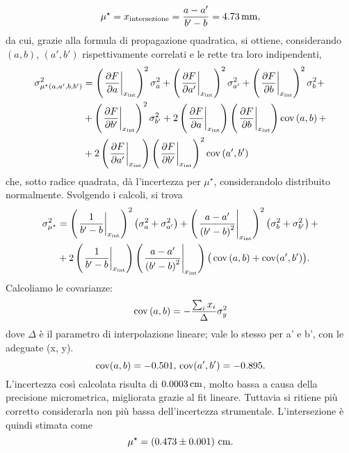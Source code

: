 \[ \mu ^{\star} = x_{\mathrm{intersezione}} = \frac{a - a'}{b' - b}  = 4.73 \,\mathrm{mm} , \]
da cui, grazie alla formula di propagazione quadratica, si ottiene, considerando $\left(a, b\right)$, $\left(a', b'\right)$ rispettivamente correlati e le rette tra loro indipendenti,
\begin{equation*}
\begin{split} %
	\sigma^2_{\mu ^{\star}\left(a, a', b, b'\right)}  &= \left(\left.\frac{\partial F}{\partial a}\right|_{x_{\mathrm{int}}}\right)^2   \sigma^2_{a} + \left(\left.\frac{\partial F}{\partial a'}\right|_{x_{\mathrm{int}}}\right)^2   \sigma^2_{a'} + \left(\left.\frac{\partial F}{\partial b}\right|_{x_{\mathrm{int}}}\right)^2   \sigma^2_{b} +\\
								&+ \left(\left.\frac{\partial F}{\partial b'}\right|_{x_{\mathrm{int}}}\right)^2   \sigma^2_{b'} + 2\left(\left.\frac{\partial F}{\partial a}\right|_{x_{\mathrm{int}}}\right)\left(\left.\frac{\partial F}{\partial b}\right|_{x_{\mathrm{int}}}\right)   \cov\left(a, b\right) + \\
								&+ 2\left(\left.\frac{\partial F}{\partial a'}\right|_{x_{\mathrm{int}}}\right)\left(\left.\frac{\partial F}{\partial b'}\right|_{x_{\mathrm{int}}}\right)^2   \cov \left(a', b'\right)
\end{split}
\end{equation*}
che, sotto radice quadrata, d\`a l'incertezza per $ \mu ^{\star} $, considerandolo distribuito normalmente.
Svolgendo i calcoli, si trova
\begin{equation}
\begin{split}
\sigma^2_{\mu ^{\star}}  &= \left(\left.\frac{1}{b'- b}\right|_{x_{\mathrm{int}}}\right)^2   \left(\sigma^2_{a} + \sigma^2_{a'}\right) + \left(\left.\frac{a - a'}{\left(b' - b\right)^2}\right|_{x_{\mathrm{int}}}\right)^2 \left(\sigma^2_{b} + \sigma^2_{b'}\right) + \\
							&+ 2 \left(\left.\frac{1}{b'- b}\right|_{x_{\mathrm{int}}}\right) \left(\left.\frac{a - a'}{\left(b' - b\right)^2}\right|_{x_{\mathrm{int}}}\right) \big(\operatorname{cov}\left(a, b\right) + \operatorname{cov}(a', b') \big).
\end{split}
\end{equation}
Calcoliamo le covarianze:
\[ \operatorname{cov}\left(a, b\right) = -\frac{\sum_{i} x_i}{\Delta}\sigma_y^2 \] 
dove $\Delta$ \`e il parametro di interpolazione lineare; vale lo stesso per a' e b', con le adeguate (x, y).
\[ \operatorname{cov}(a, b) = -0.501 , \\ \operatorname{cov}(a', b') = -0.895 . \]
L'incertezza cos\`i calcolata risulta di $0.0003\,\mathrm{cm}$, molto bassa a causa della precisione micrometrica, migliorata grazie al fit lineare. Tuttavia si ritiene pi\`u corretto considerarla non pi\`u bassa dell'incertezza strumentale. L'intersezione \`e quindi stimata come
\[ \mu ^{\star} =  \left(0.473 \pm 0.001\right) \,\mathrm{cm}. \] 

